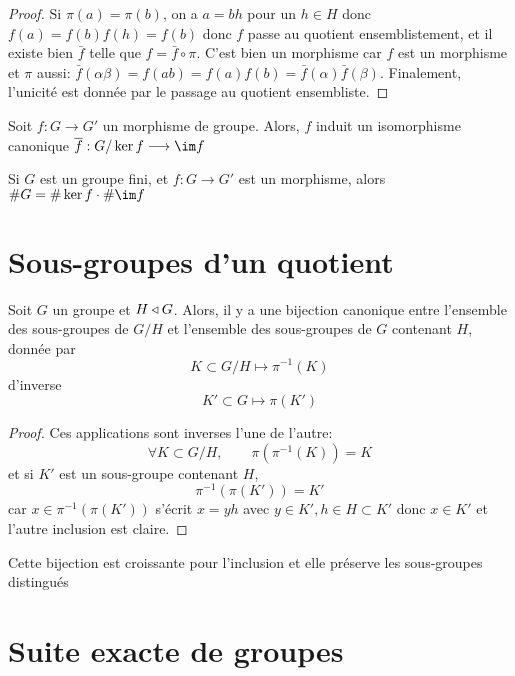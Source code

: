 \begin{proof}
    Si $\pi(a)=\pi(b)$, on a  $a=bh$ pour un  $h \in  H$ donc $f(a)=f(b)f(h)=f(b)$ donc  $f$ passe au quotient ensemblistement, et il existe bien  $\bar{f}$ telle que $f=\bar{f} \circ \pi$. C'est bien un morphisme car $f$ est un morphisme et  $\pi$ aussi:  $\bar{f}(\alpha \beta)=f(ab)=f(a)f(b)=\bar{f}(\alpha)\bar{f}(\beta)$. Finalement, l'unicité est donnée par le passage au quotient ensembliste.
\end{proof}

\begin{cor}
Soit $f : G \longrightarrow G'$ un morphisme de groupe. Alors, $f$ induit un isomorphisme canonique  $\bar{f}:G/\ker f \longrightarrow \im f$
\end{cor}

\begin{cor}
Si $G$ est un groupe fini, et  $f:G\longrightarrow G'$ est un morphisme, alors $\#G=\#\ker f \cdot \#\im f$
\end{cor}

\section{Sous-groupes d'un quotient}

\begin{thm}
Soit $G$ un groupe et  $H\triangleleft G$. Alors, il y a une bijection canonique entre l'ensemble des sous-groupes de  $G / H$ et l'ensemble des sous-groupes de  $G$ contenant  $H$, donnée par \[
    K \subset G / H \longmapsto \pi^{-1}(K)
\] 
d'inverse \[
    K' \subset G \longmapsto \pi(K')
\] 
\end{thm}

\begin{proof}
Ces applications sont inverses l'une de l'autre: \[
    \forall  K\subset G / H, \qquad  \pi(\pi^{-1}(K))=K
\] 
et si $K'$ est un sous-groupe contenant  $H$,  \[
    \pi^{-1}(\pi(K'))=K'
\] 
car $x \in \pi^{-1}(\pi(K'))$ s'écrit $x=yh$ avec  $y \in  K', h \in  H\subset K'$ donc $x \in  K'$ et  l'autre inclusion est claire.
\end{proof}

\begin{rem}
Cette bijection est croissante pour l'inclusion et elle préserve les sous-groupes distingués
\end{rem}

\section{Suite exacte de groupes}

